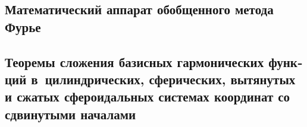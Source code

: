 
\begin{russian}
\chapter{Математический аппарат обобщенного метода Фурье}

\section[Теоремы сложения базисных гармонических функций в ци\-линд\-ри\-че\-ских, сферических, вытянутых и сжатых сфероидальных сис\-те\-мах координат со сдвинутыми началами]{Теоремы сложения базисных гармонических функций в~цилиндрических, сферических, вытянутых и сжатых сфероидальных системах координат со сдвинутыми началами}


\end{russian}
